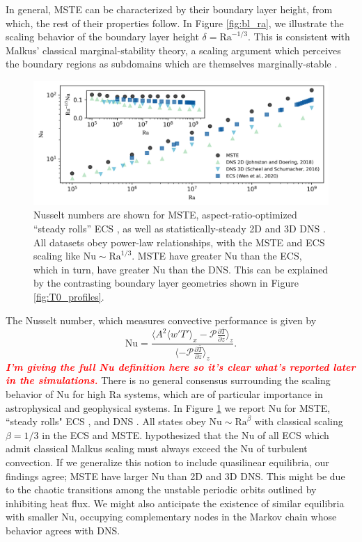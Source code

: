 \documentclass[reprint,amsmath,amssymb,aps]{revtex4-1}
\newcommand{\note}[1]{\noindent \textbf{\textit{\textcolor{Red}{#1}}}}
\newcommand\Ra{\mathrm{Ra}}
\newcommand\Nu{\mathrm{Nu}}
\begin{document}
In general, MSTE can be characterized by their boundary layer height, from which, the rest of their properties follow. In Figure \ref{fig:bl_ra}, we illustrate the scaling behavior of the boundary layer height $\delta = \Ra^{-1/3}$. 
This is consistent with Malkus' classical marginal-stability theory, a scaling argument which perceives the boundary regions as subdomains which are themselves marginally-stable \cite{Malkus_1954}.

\begin{figure}
    \centering
    \includegraphics[width=7.1in]{nu_ra.PNG}
    \caption{Nusselt numbers are shown for MSTE, aspect-ratio-optimized ``steady rolls'' ECS \cite{Wen}, as well as statistically-steady 2D and 3D DNS \cite{Johnston, Scheel_2016}.
    All datasets obey power-law relationships, with the MSTE and ECS scaling like $\Nu \sim\Ra^{1/3}$. 
    MSTE have greater $\Nu$ than the ECS, which in turn, have greater $\Nu$ than the DNS. 
    This can be explained by the contrasting boundary layer geometries shown in Figure \ref{fig:T0_profiles}.}%
    \label{fig:nu_vs_ra}%
\end{figure}

The Nusselt number, which measures convective performance is given by
\begin{equation*}
    \Nu = \frac{\langle A^2 \langle w'T' \rangle_x - \mathcal{P}\frac{\partial \bar{T}}{\partial z} \rangle_z}{\langle- \mathcal{P}\frac{\partial \bar{T}}{\partial z} \rangle_z}.
\end{equation*}
\note{I'm giving the full Nu definition here so it's clear what's reported later in the simulations.}
There is no general consensus surrounding the scaling behavior of $\Nu$ for high $\Ra$ systems, which are of particular importance in astrophysical and geophysical systems. In Figure \ref{fig:nu_vs_ra} we report $\Nu$ for MSTE, ``steady rolls" ECS \cite{Wen}, and DNS \cite{Scheel_2016, Johnston}. 
All states obey $\Nu \sim\Ra^{\beta}$ with classical scaling $\beta = 1/3$ in the ECS and MSTE. 
\cite{Wen} hypothesized that the $\Nu$ of all ECS which admit classical Malkus scaling must always exceed the $\Nu$ of turbulent convection.
If we generalize this notion to include quasilinear equilibria, our findings agree; MSTE have larger $\Nu$ than 2D and 3D DNS.
This might be due to the chaotic transitions among the unstable periodic orbits outlined by \cite{Yalniz, Cvitanovic} inhibiting heat flux. 
We might also anticipate the existence of similar equilibria with smaller $\Nu$, occupying complementary nodes in the Markov chain whose behavior agrees with DNS. 
\end{document}
